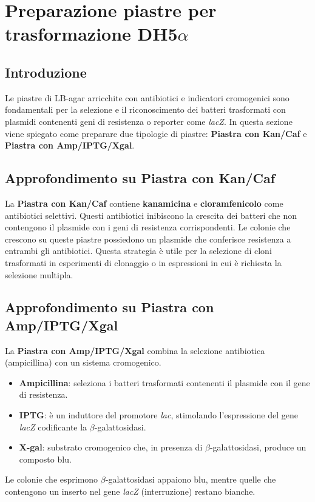 \section {Preparazione piastre per trasformazione DH5$\alpha$}

\subsection{Introduzione}
Le piastre di LB-agar arricchite con antibiotici e indicatori cromogenici sono fondamentali per la selezione e il riconoscimento dei batteri trasformati con plasmidi contenenti geni di resistenza o reporter come \textit{lacZ}. In questa sezione viene spiegato come preparare due tipologie di piastre: \textbf{Piastra con Kan/Caf} e \textbf{Piastra con Amp/IPTG/Xgal}.

\subsection{Approfondimento su Piastra con Kan/Caf}
La \textbf{Piastra con Kan/Caf} contiene \textbf{kanamicina} e \textbf{cloramfenicolo} come antibiotici selettivi. Questi antibiotici inibiscono la crescita dei batteri che non contengono il plasmide con i geni di resistenza corrispondenti. Le colonie che crescono su queste piastre possiedono un plasmide che conferisce resistenza a entrambi gli antibiotici. Questa strategia è utile per la selezione di cloni trasformati in esperimenti di clonaggio o in espressioni in cui è richiesta la selezione multipla.

\subsection{Approfondimento su Piastra con Amp/IPTG/Xgal}
La \textbf{Piastra con Amp/IPTG/Xgal} combina la selezione antibiotica (ampicillina) con un sistema cromogenico. 
\begin{itemize}\footnotesize
  \item \textbf{Ampicillina}: seleziona i batteri trasformati contenenti il plasmide con il gene di resistenza.
  \item \textbf{IPTG}: è un induttore del promotore \textit{lac}, stimolando l’espressione del gene \textit{lacZ} codificante la $\beta$-galattosidasi.
  \item \textbf{X-gal}: substrato cromogenico che, in presenza di $\beta$-galattosidasi, produce un composto blu.
\end{itemize}
Le colonie che esprimono $\beta$-galattosidasi appaiono blu, mentre quelle che contengono un inserto nel gene \textit{lacZ} (interruzione) restano bianche.

